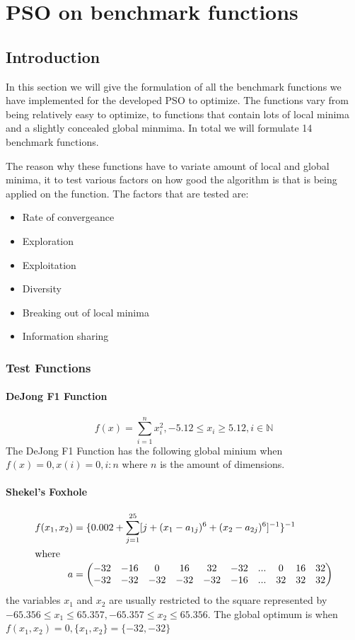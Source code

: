 \chapter{PSO on benchmark functions}
\section{Introduction}
In this section we will give the formulation of all the benchmark functions we have implemented for the developed PSO to optimize. The functions vary from being relatively easy to optimize, to functions that contain lots of local minima and a slightly concealed global minmima. In total we will formulate 14 benchmark functions.

The reason why these functions have to variate amount of local and global minima, it to test various factors on how good the algorithm is that is being applied on the function. The factors that are tested are:
\begin{itemize}
\item Rate of convergeance
\item Exploration
\item Exploitation
\item Diversity
\item Breaking out of local minima
\item Information sharing
\end{itemize}
\subsection{Test Functions}
\subsubsection{DeJong F1 Function}
\begin{equation}
\label{eq:DeJongF1}
	f(x) = \sum_{i=1}^n x^2_i, -5.12 \leq x_i \geq 5.12, i \in \mathbb{N}
\end{equation}
The DeJong F1 Function has the following global minium when $f(x) = 0, x(i) = 0, i:n$ where $n$ is the amount of dimensions. 
\subsubsection{Shekel's Foxhole}
\begin{align}
	f(x_1,x_2) &= \{0.002 + \sum^{25}_{j=1} [j + (x_1 - a_{1j})^6 + (x_2 - a_{2j})^6]^{-1}\}^{-1}\\
\intertext{where}
	a &= \begin{pmatrix} \nonumber
			-32 & -16 & 0 & 16 & 32 & -32 & ... & 0 & 16 & 32 \\
			-32 & -32 & -32 & -32 & -32 & -16 & ... & 32 & 32 & 32 \\
		 \end{pmatrix}
\end{align}
the variables $x_1$ and $x_2$ are usually restricted to the square represented by $-65.356 \leq x_1 \leq 65.357, -65.357 \leq x_2 \leq 65.356$. The global optimum is when $f(x_1,x_2) = 0, \{x_1,x_2\} = \{-32,-32\}$
